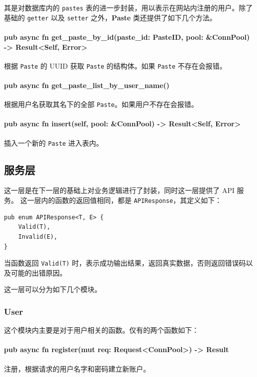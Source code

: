 \documentclass[ichigo,normal,cn]{elegantnote}
\newcommand{\code}[1]{\colorbox{light-gray}{\texttt{#1}}}
\begin{document}
其是对数据库内的 \code{pastes} 表的进一步封装，用以表示在网站内注册的用户。除了基础的 \code{getter} 以及 \code{setter} 之外，\textbf{Paste} 类还提供了如下几个方法。

\paragraph{pub async fn get\_paste\_by\_id(paste\_id: PasteID, pool: \&ConnPool) -> Result<Self, Error>}
根据  \code{Paste} 的 UUID 获取  \code{Paste} 的结构体。如果  \code{Paste} 不存在会报错。

\paragraph{pub async fn get\_paste\_list\_by\_user\_name()}
根据用户名获取其名下的全部 \code{Paste}。如果用户不存在会报错。

\paragraph{pub async fn insert(self, pool: \&ConnPool) -> Result<Self, Error>}
插入一个新的 \code{Paste} 进入表内。

\subsection{服务层}

这一层是在下一层的基础上对业务逻辑进行了封装，同时这一层提供了 API 服务。
这一层内的函数的返回值相同，都是 \code{APIResponse}，其定义如下：

\begin{lstlisting}
pub enum APIResponse<T, E> {
    Valid(T),
    Invalid(E),
}
\end{lstlisting}

当函数返回 \code{Valid(T)} 时，表示成功输出结果，返回真实数据，否则返回错误码以及可能的出错原因。

这一层可以分为如下几个模块。

\subsubsection{User}
这个模块内主要是对于用户相关的函数。仅有的两个函数如下：

\paragraph{pub async fn register(mut req: Request<ConnPool>) -> Result}
注册，根据请求的用户名字和密码建立新账户。
\end{document}
